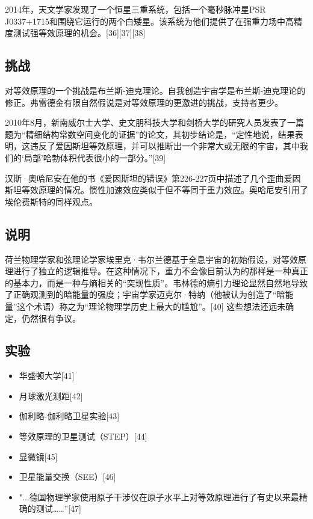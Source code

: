 2014年，天文学家发现了一个恒星三重系统，包括一个毫秒脉冲星PSR J0337+1715和围绕它运行的两个白矮星。该系统为他们提供了在强重力场中高精度测试强等效原理的机会。[36][37][38]

\subsection{挑战}

对等效原理的一个挑战是布兰斯-迪克理论。自我创造宇宙学是布兰斯-迪克理论的修正。弗雷德金有限自然假说是对等效原理的更激进的挑战，支持者更少。

2010年8月，新南威尔士大学、史文朋科技大学和剑桥大学的研究人员发表了一篇题为“精细结构常数空间变化的证据”的论文，其初步结论是，“定性地说，结果表明，这违反了爱因斯坦等效原理，并可以推断出一个非常大或无限的宇宙，其中我们的‘局部’哈勃体积代表很小的一部分。”[39]

汉斯·奥哈尼安在他的书《爱因斯坦的错误》第226-227页中描述了几个歪曲爱因斯坦等效原理的情况。惯性加速效应类似于但不等同于重力效应。奥哈尼安引用了埃伦费斯特的同样观点。

\subsection{说明}

荷兰物理学家和弦理论学家埃里克·韦尔兰德基于全息宇宙的初始假设，对等效原理进行了独立的逻辑推导。在这种情况下，重力不会像目前认为的那样是一种真正的基本力，而是一种与熵相关的“突现性质”。韦林德的熵引力理论显然自然地导致了正确观测到的暗能量的强度；宇宙学家迈克尔·特纳（他被认为创造了“暗能量”这个术语）称之为“理论物理学历史上最大的尴尬”。[40] 这些想法还远未确定，仍然很有争议。

\subsection{实验}

\begin{itemize}
\item 华盛顿大学[41]
\item 月球激光测距[42]
\item 伽利略-伽利略卫星实验[43]
\item 等效原理的卫星测试（STEP）[44]
\item 显微镜[45]
\item 卫星能量交换（SEE）[46]
\item "...德国物理学家使用原子干涉仪在原子水平上对等效原理进行了有史以来最精确的测试……”[47]
\end{itemize}


